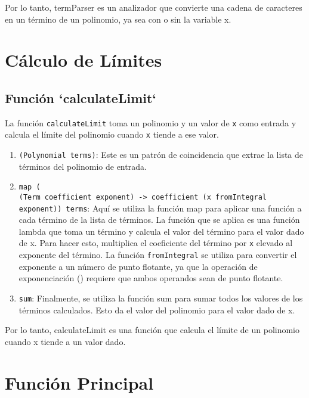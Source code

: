 \documentclass{article}
\begin{document}
Por lo tanto, termParser es un analizador que convierte una cadena de caracteres en un término de un polinomio, ya sea con o sin la variable x.

\section{Cálculo de Límites}

\subsection{Función `calculateLimit`}

La función \texttt{calculateLimit} toma un polinomio y un valor de \texttt{x} como entrada y calcula el límite del polinomio cuando \texttt{x} tiende a ese valor.

\begin{enumerate}
  \item \texttt{(Polynomial terms)}: Este es un patrón de coincidencia que extrae la lista de términos del polinomio de entrada.
  \item \texttt{map (\\(Term coefficient exponent) -> coefficient \* (x \*\* fromIntegral exponent)) terms}: Aquí se utiliza la función map para aplicar una función a cada término de la lista de términos. La función que se aplica es una función lambda que toma un término y calcula el valor del término para el valor dado de x. Para hacer esto, multiplica el coeficiente del término por \texttt{x} elevado al exponente del término. La función \texttt{fromIntegral} se utiliza para convertir el exponente a un número de punto flotante, ya que la operación de exponenciación (\*\*) requiere que ambos operandos sean de punto flotante.
  \item \texttt{sum}: Finalmente, se utiliza la función sum para sumar todos los valores de los términos calculados. Esto da el valor del polinomio para el valor dado de x.
\end{enumerate}

Por lo tanto, calculateLimit es una función que calcula el límite de un polinomio cuando x tiende a un valor dado.

\section{Función Principal}
\end{document}
